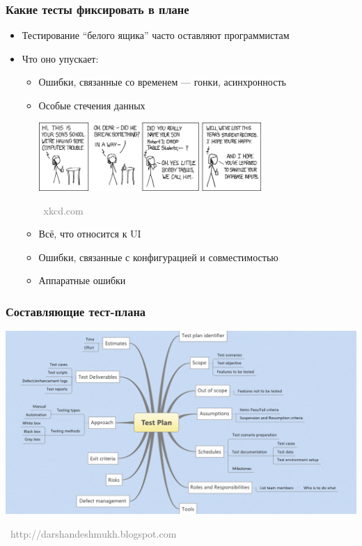 \documentclass[xetex,mathserif,serif]{beamer}
\newcommand{\attribution}[1] {
	\begin{flushright}\begin{scriptsize}\textcolor{gray}{\textcopyright\, #1}\end{scriptsize}\end{flushright}
}
\begin{document}
	\begin{frame}
		\frametitle{Какие тесты фиксировать в плане}
		\begin{itemize}
			\item Тестирование ``белого ящика'' часто оставляют программистам
			\item Что оно упускает:
			\begin{itemize}
				\item Ошибки, связанные со временем --- гонки, асинхронность
				\item Особые стечения данных
				\begin{center}
					\includegraphics[width=0.7\textwidth]{xkcd.png}
					\attribution{xkcd.com}
				\end{center}
				\item Всё, что относится к UI
				\item Ошибки, связанные с конфигурацией и совместимостью
				\item Аппаратные ошибки
			\end{itemize}
		\end{itemize}
	\end{frame}

	\begin{frame}
		\frametitle{Составляющие тест-плана}
		\begin{center}
			\includegraphics[width=\textwidth]{testPlan.png}
			\attribution{http://darshandeshmukh.blogspot.com}
		\end{center}
	\end{frame}
\end{document}
